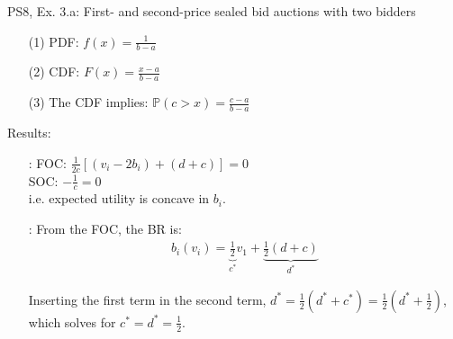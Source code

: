 \begin{frame}{PS8, Ex. 3.a: First- and second-price sealed bid auctions with two bidders}
\begin{multicols}{2}
\begin{enumerate}
        \item[(1)] PDF: $f(x)=\frac{1}{b-a}$
        \item[(2)] CDF: $F(x)=\frac{x-a}{b-a}$
        \item[(3)] The CDF implies: $\mathbb{P}(c>x)=\frac{c-a}{b-a}$
      \end{enumerate}
      \vspace{-6pt}
      Results:
      \vspace{-6pt}
      \begin{itemize}
        \item[\nth{2}:] FOC: $\frac{1}{2c}[(v_i-2b_i)+(d+c)]=0$\\
                        SOC: $-\frac{1}{c}=0$\\
                        i.e. expected utility is concave in $b_i$.
        \item[\nth{3}:] From the FOC, the BR is:\vspace{-6pt}
                        \begin{align*}
                          b_i(v_i)=\underbrace{\frac{1}{2}}_{c^*}v_1+\underbrace{\frac{1}{2}(d+c)}_{d^*}
                        \end{align*}
        \item[]         \vspace{-6pt} Inserting the first term in the second term, $d^*=\frac{1}{2}(d^*+c^*)=\frac{1}{2}(d^*+\frac{1}{2})$, which solves for $c^*=d^*=\frac{1}{2}$.
      \end{itemize}
      \vfill\null
    \end{multicols}
\end{frame}


